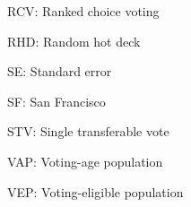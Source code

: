 \documentclass[12pt,twoside]{reedthesis}
\begin{document}
\begin{abbrevs}
    \noindent RCV: Ranked choice voting
    
    \par
    
    \noindent RHD: Random hot deck
    
    \par
    
    \noindent SE: Standard error
    
    \par
    
    \noindent SF: San Francisco
    
    \par
    
    \noindent STV: Single transferable vote
    
    \par
    
    \noindent VAP: Voting-age population
    
    \par
    
    \noindent VEP: Voting-eligible population
    
    \par
  \end{abbrevs}
  \hypersetup{linkcolor=black}
  \setcounter{tocdepth}{1}
  \tableofcontents

  \listoftables
\end{document}
